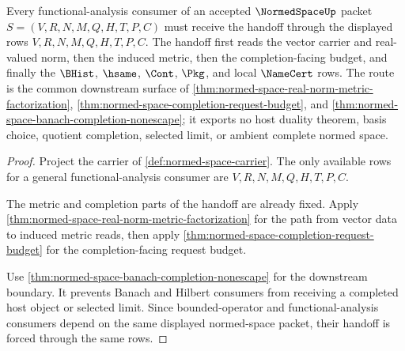 \begin{theorem}
\label{thm:normedspace-functional-analysis-handoff}
Every functional-analysis consumer of an accepted $\NormedSpaceUp$ packet $S=(V,R,N,M,Q,H,T,P,C)$ must receive the handoff through the displayed rows $V,R,N,M,Q,H,T,P,C$. The handoff first reads the vector carrier and real-valued norm, then the induced metric, then the completion-facing budget, and finally the $\BHist$, $\hsame$, $\Cont$, $\Pkg$, and local $\NameCert$ rows. The route is the common downstream surface of \autoref{thm:normed-space-real-norm-metric-factorization}, \autoref{thm:normed-space-completion-request-budget}, and \autoref{thm:normed-space-banach-completion-nonescape}; it exports no host duality theorem, basis choice, quotient completion, selected limit, or ambient complete normed space.
\end{theorem}
\begin{proof}
Project the carrier of \autoref{def:normed-space-carrier}. The only available rows for a general functional-analysis consumer are $V,R,N,M,Q,H,T,P,C$.

The metric and completion parts of the handoff are already fixed. Apply \autoref{thm:normed-space-real-norm-metric-factorization} for the path from vector data to induced metric reads, then apply \autoref{thm:normed-space-completion-request-budget} for the completion-facing request budget.

Use \autoref{thm:normed-space-banach-completion-nonescape} for the downstream boundary. It prevents Banach and Hilbert consumers from receiving a completed host object or selected limit. Since bounded-operator and functional-analysis consumers depend on the same displayed normed-space packet, their handoff is forced through the same rows.
\end{proof}

